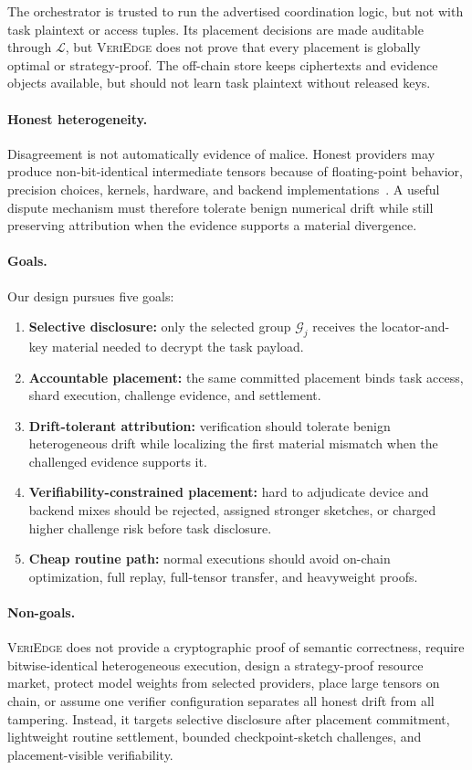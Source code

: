 \documentclass[sigplan,screen,review,anonymous]{acmart}
\newcommand{\system}{\textsc{VeriEdge}\xspace}
\begin{document}
The orchestrator is trusted to run the advertised coordination logic, but not
with task plaintext or access tuples. Its placement decisions are made
auditable through \(\mathcal{L}\), but \system does not prove that every
placement is globally optimal or strategy-proof. The off-chain store keeps
ciphertexts and evidence objects available, but should not learn task
plaintext without released keys.

\paragraph{Honest heterogeneity.}
Disagreement is not automatically evidence of malice. Honest providers may
produce non-bit-identical intermediate tensors because of floating-point
behavior, precision choices, kernels, hardware, and backend
implementations~\cite{goldberg1991floating,higham2002accuracy}. A useful
dispute mechanism must therefore tolerate benign numerical drift while still
preserving attribution when the evidence supports a material divergence.

\paragraph{Goals.}
Our design pursues five goals:
\begin{enumerate}[leftmargin=1.5em,label=\textbf{G\arabic*:},nosep]
	\item \textbf{Selective disclosure:} only the selected group
	\(\mathcal{G}_j\) receives the locator-and-key material needed to decrypt
	the task payload.
	\item \textbf{Accountable placement:} the same committed placement binds
	task access, shard execution, challenge evidence, and settlement.
	\item \textbf{Drift-tolerant attribution:} verification should tolerate
	benign heterogeneous drift while localizing the first material mismatch
	when the challenged evidence supports it.
	\item \textbf{Verifiability-constrained placement:} hard to adjudicate
	device and backend mixes should be rejected, assigned stronger sketches, or
	charged higher challenge risk before task disclosure.
	\item \textbf{Cheap routine path:} normal executions should avoid
	on-chain optimization, full replay, full-tensor transfer, and heavyweight
	proofs.
\end{enumerate}

\paragraph{Non-goals.}
\system does not provide a cryptographic proof of semantic correctness,
require bitwise-identical heterogeneous execution, design a strategy-proof
resource market, protect model weights from selected providers, place large
tensors on chain, or assume one verifier configuration separates all honest
drift from all tampering. Instead, it targets selective disclosure after
placement commitment, lightweight routine settlement, bounded
checkpoint-sketch challenges, and placement-visible verifiability.
\end{document}
